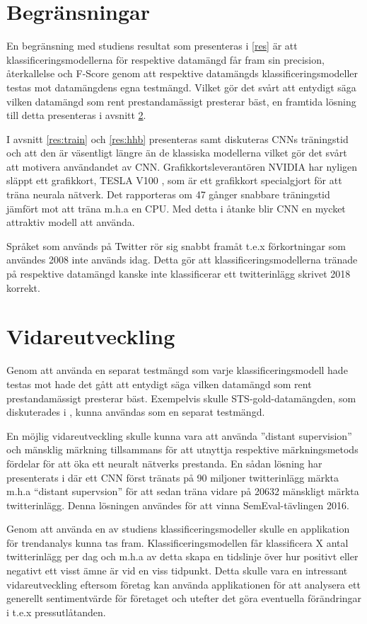 \documentclass{kaumasters} %
\begin{document}
\section{Begränsningar}
En begränsning med studiens resultat som presenteras i \ref{res} är att klassificeringsmodellerna för respektive datamängd får fram sin precision, återkallelse och F-Score genom att respektive datamängds klassificeringsmodeller testas mot datamängdens egna testmängd. Vilket gör det svårt att entydigt säga vilken datamängd som rent prestandamässigt presterar bäst, en framtida lösning till detta presenteras i avsnitt \ref{slut:fw}.

I avsnitt \ref{res:train} och \ref{res:hhb} presenteras samt diskuteras CNNs träningstid och att den är väsentligt längre än de klassiska modellerna vilket gör det svårt att motivera användandet av CNN. Grafikkortsleverantören NVIDIA har nyligen släppt ett grafikkort, TESLA V100 \cite{slut:002}, som är ett grafikkort specialgjort för att träna neurala nätverk. Det rapporteras om 47 gånger snabbare träningstid jämfört mot att träna m.h.a en CPU. Med detta i åtanke blir CNN en mycket attraktiv modell att använda. 

Språket som används på Twitter rör sig snabbt framåt t.e.x förkortningar som användes 2008 inte används idag. Detta gör att klassificeringsmodellerna tränade på respektive datamängd kanske inte klassificerar ett twitterinlägg skrivet 2018 korrekt. 
\section{Vidareutveckling} \label{slut:fw}
Genom att använda en separat testmängd som varje klassificeringsmodell hade testas mot hade det gått att entydigt säga vilken datamängd som rent prestandamässigt presterar bäst. Exempelvis skulle STS-gold-datamängden, som diskuterades i \cite{slut:testmangd}, kunna användas som en separat testmängd.

En möjlig vidareutveckling skulle kunna vara att använda ''distant supervision'' och mänsklig märkning tillsammans för att utnyttja respektive märkningsmetods fördelar för att öka ett neuralt nätverks prestanda. En sådan lösning har presenterats i \cite{slut:004} där ett CNN först tränats på 90 miljoner twitterinlägg märkta m.h.a “distant supervsion” för att sedan träna vidare på 20632 mänskligt märkta twitterinlägg. Denna lösningen användes för att vinna SemEval-tävlingen 2016. 

Genom att använda en av studiens klassificeringsmodeller skulle en applikation för trendanalys kunna tas fram. Klassificeringsmodellen får klassificera X antal twitterinlägg per dag och m.h.a av detta skapa en tidslinje över hur positivt eller negativt ett visst ämne är vid en viss tidpunkt. Detta skulle vara en intressant vidareutveckling eftersom företag kan använda applikationen för att analysera ett generellt sentimentvärde för företaget och utefter det göra eventuella förändringar i t.e.x pressutlåtanden.
\end{document}
